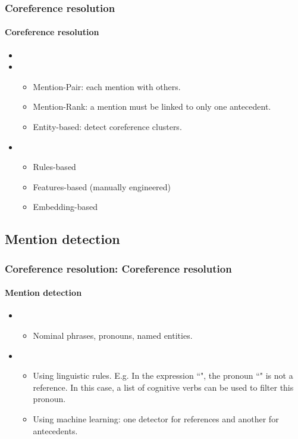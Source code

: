 \documentclass[xcolor=table]{beamer}
\begin{document}
\begin{frame}
	\frametitle{Coreference resolution}
	\framesubtitle{Coreference resolution}
	
	
	\begin{itemize}
		\item {}
		\item {}
		\begin{itemize}
			\item Mention-Pair: each mention with others.
			\item Mention-Rank: a mention must be linked to only one antecedent.
			\item Entity-based: detect coreference clusters.
		\end{itemize}
		
		\item {}
		\begin{itemize}
			\item Rules-based
			\item Features-based (manually engineered)
			\item Embedding-based
		\end{itemize}
	\end{itemize}
	
\end{frame}


\subsection{Mention detection}

\begin{frame}
	\frametitle{Coreference resolution: Coreference resolution}
	\framesubtitle{Mention detection}
	
	\begin{itemize}
		\item {}
		\begin{itemize}
			\item Nominal phrases, pronouns, named entities.
		\end{itemize}
	
		\item {}
		\begin{itemize}
			\item Using linguistic rules. E.g. In the expression ``", the pronoun ``" is not a reference. In this case, a list of cognitive verbs  can be used to filter this pronoun.
			\item Using machine learning: one detector for references and another for antecedents.
		\end{itemize}
	
	\end{itemize}
	
\end{frame}
\end{document}
